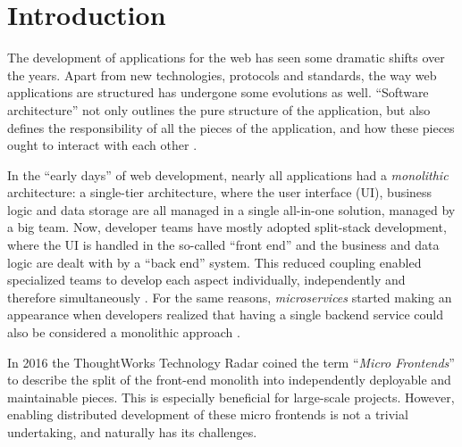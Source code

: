 
\section{Introduction}
\label{sec:introduction}


The development of applications for the web has seen some dramatic shifts over
the years. Apart from new technologies, protocols and standards, the way web
applications are structured has undergone some evolutions as well. ``Software
architecture'' not only outlines the pure structure of the application, but also
defines the responsibility of all the pieces of the application, and how these
pieces ought to interact with each other \autocite{Fedorov_etal_1998}.

In the ``early days'' of web development, nearly all applications had a
\textit{monolithic} architecture: a single-tier architecture, where the user
interface (UI), business logic and data storage are all managed in a single
all-in-one solution, managed by a big team. Now, developer teams have mostly
adopted split-stack development, where the UI is handled in the so-called
``front end'' and the business and data logic are dealt with by a ``back end''
system. This reduced coupling enabled specialized teams to develop each aspect
individually, independently and therefore simultaneously
\autocite{Dunkley_2016}. For the same reasons, \textit{microservices} started
making an appearance when developers realized that having a single backend
service could also be considered a monolithic approach
\autocite{Fowler_Microservices_2014}.

In 2016 the ThoughtWorks Technology Radar \autocite{ThoughtWorks_2020} coined
the term ``\textit{Micro Frontends}'' to describe the split of the front-end
monolith into independently deployable and maintainable pieces. This is
especially beneficial for large-scale projects. However, enabling distributed
development of these micro frontends is not a trivial undertaking, and naturally
has its challenges.

